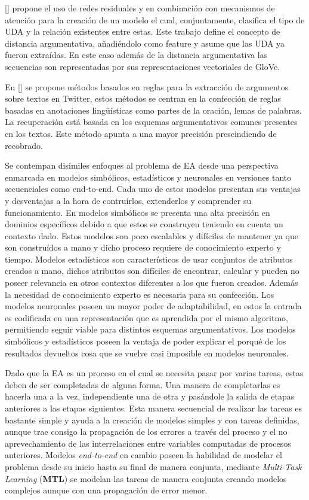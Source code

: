 [\cite{galassi2018argumentative}] propone el uso de redes residuales y en combinación con mecanismos de atención
para la creación de un modelo el cual, conjuntamente, clasifica el tipo de UDA y la relación existentes entre estas.
Este trabajo define el concepto de distancia argumentativa, añadiéndolo como feature y asume que las UDA ya fueron 
extraídas. En este caso además de la distancia argumentativa las secuencias son representadas por sus representaciones
vectoriales de GloVe.

En [\cite{dykes2020reconstructing}] se propone métodos basados en reglas para la extracción de argumentos sobre
textos en Twitter, estos métodos se centran en la confección de reglas basadas en anotaciones lingüísticas como
partes de la oración, lemas de palabras. La recuperación está basada en los esquemas argumentativos comunes presentes
en los textos. Este método apunta a una mayor precisión prescindiendo de recobrado. 

Se contempan disímiles enfoques al problema de EA desde una perspectiva enmarcada en modelos 
simbólicos, estadísticos y neuronales en versiones tanto secuenciales como end-to-end. 
Cada uno de estos modelos presentan sus ventajas y desventajas a la hora de contruirlos, 
extenderlos y comprender su funcionamiento. En modelos simbólicos se presenta una alta
precisión en dominios específicos debido a que estos se construyen teniendo en cuenta un
contexto dado. Estos modelos son poco escalables y difíciles de mantener ya que son construídos
a mano y dicho proceso requiere de conocimiento experto y tiempo. Modelos estadísticos son
característicos de usar conjuntos de atributos creados a mano, dichos atributos son difíciles
de encontrar, calcular y pueden no poseer relevancia en otros contextos diferentes a los que fueron creados. 
Además la necesidad de conocimiento experto es necesaria para su confección. Los modelos neuronales poseen
un mayor poder de adaptabilidad, en estos la entrada es codificada en una representación que es aprendida por
el mismo algoritmo, permitiendo seguir viable para distintos esquemas argumentativos. Los modelos simbólicos y 
estadísticos poseen la ventaja de poder explicar el porqué de los resultados devueltos cosa que se vuelve casi
imposible en modelos neuronales.

Dado que la EA es un proceso en el cual se necesita pasar por varias tareas, estas deben de ser completadas
de alguna forma. Una manera de completarlas es hacerla una a la vez, independiente una de otra y pasándole
la salida de etapas anteriores a las etapas siguientes. Esta manera secuencial de realizar las 
tareas es bastante simple y ayuda a la creación de modelos simples y con tareas definidas, aunque trae consigo 
la propagación de los errores a través del proceso y el no aprevechamiento de las interrelaciones entre variables 
computadas de procesos anteriores. Modelos \emph{end-to-end} en cambio poseen la habilidad de modelar el problema 
desde su inicio hasta su final de manera conjunta, mediante \emph{Multi-Task Learning} (\textbf{MTL}) se modelan
las tareas de manera conjunta creando modelos complejos aunque con una propagación de error menor.


